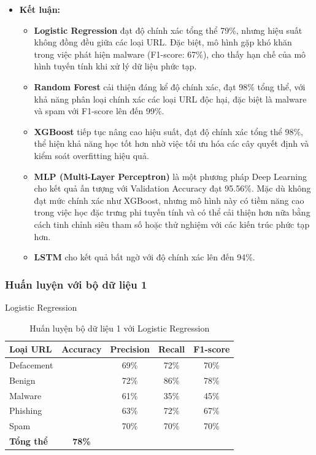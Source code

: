 \documentclass[13pt]{article}
\begin{document}
\begin{itemize}
    \item \textbf{Kết luận: }
    \begin{itemize}
        \item \textbf{Logistic Regression} đạt độ chính xác tổng thể 79\%, nhưng hiệu suất không đồng đều giữa các loại URL. Đặc biệt, mô hình gặp khó khăn trong việc phát hiện malware (F1-score: 67\%), cho thấy hạn chế của mô hình tuyến tính khi xử lý dữ liệu phức tạp.
        \item \textbf{Random Forest} cải thiện đáng kể độ chính xác, đạt 98\% tổng thể, với khả năng phân loại chính xác các loại URL độc hại, đặc biệt là malware và spam với F1-score lên đến 99\%.
        \item \textbf{XGBoost} tiếp tục nâng cao hiệu suất, đạt độ chính xác tổng thể 98\%, thể hiện khả năng học tốt hơn nhờ việc tối ưu hóa các cây quyết định và kiểm soát overfitting hiệu quả.
        \item \textbf{MLP (Multi-Layer Perceptron) } là một phương pháp Deep Learning cho kết quả ấn tượng với Validation Accuracy đạt 95.56\%. Mặc dù không đạt mức chính xác như XGBoost, nhưng mô hình này có tiềm năng cao trong việc học đặc trưng phi tuyến tính và có thể cải thiện hơn nữa bằng cách tinh chỉnh siêu tham số hoặc thử nghiệm với các kiến trúc phức tạp hơn.
        \item \textbf{LSTM} cho kết quả bất ngờ với độ chính xác lên đến 94\%.
    \end{itemize}
\end{itemize}

\subsubsection{Huấn luyện với bộ dữ liệu 1}
Logistic Regression
\begin{table}[h]
    \centering
    \renewcommand{\arraystretch}{1.3} %
    \begin{tabular}{|l|c|c|c|c|}
        \hline
        \rowcolor[HTML]{C0C0C0} %
        \textbf{Loại URL} & \textbf{Accuracy} & \textbf{Precision} & \textbf{Recall} & \textbf{F1-score} \\ 
        \hline
        Defacement &  & 69\% & 72\% & 70\% \\ 
        \hline
        Benign &  & 72\% & 86\% & 78\% \\ 
        \hline
        Malware &  & 61\% & 35\% & 45\% \\ 
        \hline
        Phishing &  & 63\% & 72\% & 67\% \\ 
        \hline
        Spam &  & 70\% & 70\% & 70\% \\ 
        \hline
        \textbf{Tổng thể} & \textbf{78\%} &  &  &  \\ 
        \hline
    \end{tabular}
    \caption{Huấn luyện bộ dữ liệu 1 với Logistic Regression}
    \label{tab:logistic_regression}
\end{table}
\end{document}
